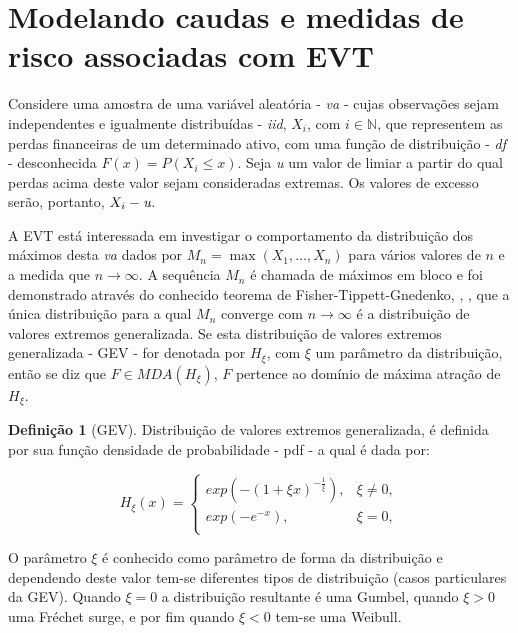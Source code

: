 \documentclass[review]{elsarticle}
\theoremstyle{definition}
\newtheorem{defi}[teor]{Definição}
\begin{document}
\section{Modelando caudas e medidas de risco associadas com EVT}
\label{sec:caudas}

Considere uma amostra de uma variável aleatória - \emph{va} - cujas observações sejam independentes e igualmente distribuídas - \emph{iid}, $X_i$, com $i\in \mathbb{N}$, que representem as perdas financeiras de um determinado ativo, com uma função de distribuição - \emph{df} - desconhecida $F(x) = P(X_i \leq x)$.
Seja \emph{u} um valor de limiar a partir do qual perdas acima deste valor sejam consideradas extremas. Os valores de excesso serão, portanto, $X_i - \emph{u}$.

A EVT está interessada em investigar o comportamento da distribuição dos máximos desta \emph{va} dados por $M_n = \max (X_1, \ldots , X_n)$ para vários valores de $n$ e a medida que $n\rightarrow \infty$. A sequência $M_n$ é chamada de máximos em bloco e foi demonstrado através do conhecido teorema de Fisher-Tippett-Gnedenko, \cite{Fisher1928}, \cite{Gnedenko1941, Gnedenko1943}, que a única distribuição para a qual $M_n$ converge com $n\rightarrow \infty$ é a distribuição de valores extremos generalizada. Se esta distribuição de valores extremos generalizada - GEV - for denotada por $H_\xi$, com $\xi$ um parâmetro da distribuição, então se diz que $F \in MDA(H_\xi)$, $F$ pertence ao domínio de máxima atração de $H_\xi$.


\begin{defi}[GEV] \label{defi:GEV}
	Distribuição de valores extremos generalizada, é definida por sua função densidade de probabilidade - pdf - a qual é dada por:
	
	\begin{equation}
	\label{eq:GEV}
	H_\xi(x) = 
	\begin{cases}
	exp(-(1+\xi x)^{-\frac{1}{\xi}}), & \xi \neq 0,\\
	exp(-e^{-x}), & \xi = 0,\\
	\end{cases}
	\end{equation}
\end{defi}

O parâmetro $\xi$ é conhecido como parâmetro de forma da distribuição e dependendo deste valor tem-se diferentes tipos de distribuição (casos particulares da GEV). Quando $\xi=0$ a distribuição resultante é uma Gumbel, quando  $\xi>0$ uma Fréchet surge, e por fim quando $\xi<0$ tem-se uma Weibull.
\end{document}
